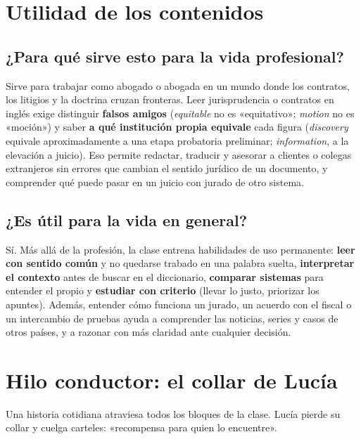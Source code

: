 \documentclass[12pt,oneside]{book}
\begin{document}
\section*{Utilidad de los contenidos}

\subsection*{¿Para qué sirve esto para la vida profesional?}

Sirve para trabajar como abogado o abogada en un mundo donde los contratos, los litigios y la doctrina cruzan fronteras. Leer jurisprudencia o contratos en inglés exige distinguir \textbf{falsos amigos} (\textit{equitable} no es «equitativo»; \textit{motion} no es «moción») y saber \textbf{a qué institución propia equivale} cada figura (\textit{discovery} equivale aproximadamente a una etapa probatoria preliminar; \textit{information}, a la elevación a juicio). Eso permite redactar, traducir y asesorar a clientes o colegas extranjeros sin errores que cambian el sentido jurídico de un documento, y comprender qué puede pasar en un juicio con jurado de otro sistema.

\subsection*{¿Es útil para la vida en general?}

Sí. Más allá de la profesión, la clase entrena habilidades de uso permanente: \textbf{leer con sentido común} y no quedarse trabado en una palabra suelta, \textbf{interpretar el contexto} antes de buscar en el diccionario, \textbf{comparar sistemas} para entender el propio y \textbf{estudiar con criterio} (llevar lo justo, priorizar los apuntes). Además, entender cómo funciona un jurado, un acuerdo con el fiscal o un intercambio de pruebas ayuda a comprender las noticias, series y casos de otros países, y a razonar con más claridad ante cualquier decisión.

\section*{Hilo conductor: el collar de Lucía}

Una historia cotidiana atraviesa todos los bloques de la clase. Lucía pierde su collar y cuelga carteles: «recompensa para quien lo encuentre».
\end{document}
